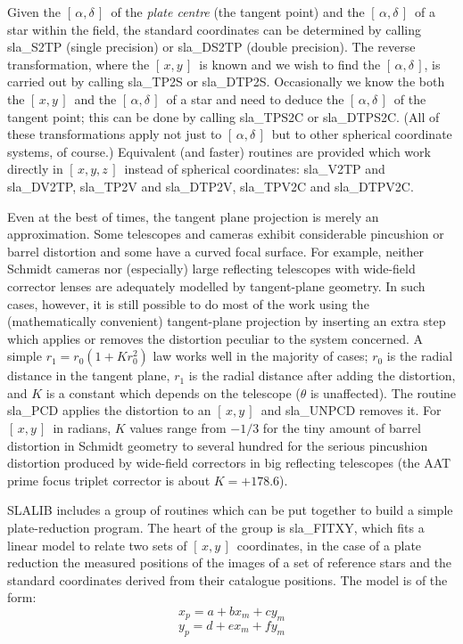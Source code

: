 \documentclass[11pt,twoside,nolof]{starlink}
\providecommand{\radec}     {$[\,\alpha,\delta\,]$}
\providecommand{\xy}        {$[\,x,y\,]$}
\providecommand{\xyz}       {$[\,x,y,z\,]$}
\begin{document}
Given the \radec\ of the \textit{plate centre}\/ (the tangent point)
and the \radec\ of a star within the field, the standard
coordinates can be determined by calling
sla\_S2TP
(single precision) or
sla\_DS2TP
(double precision).  The reverse transformation, where the
\xy\ is known and we wish to find the \radec, is carried out by calling
sla\_TP2S
or
sla\_DTP2S.
Occasionally we know the both the \xy\ and the \radec\ of a
star and need to deduce the \radec\ of the tangent point;
this can be done by calling
sla\_TPS2C
or
sla\_DTPS2C.
(All of these transformations apply not just to \radec\ but to
other spherical coordinate systems, of course.)
Equivalent (and faster)
routines are provided which work directly in \xyz\ instead of
spherical coordinates:
sla\_V2TP and
sla\_DV2TP,
sla\_TP2V and
sla\_DTP2V,
sla\_TPV2C and
sla\_DTPV2C.

Even at the best of times, the tangent plane projection is merely an
approximation.  Some telescopes and cameras exhibit considerable pincushion
or barrel distortion and some have a curved focal surface.
For example, neither Schmidt cameras nor (especially)
large reflecting telescopes with wide-field corrector lenses
are adequately modelled by tangent-plane geometry.  In such
cases, however, it is still possible to do most of the work
using the (mathematically convenient) tangent-plane
projection by inserting an extra step which applies or
removes the distortion peculiar to the system concerned.
A simple $r_1=r_0(1+Kr_0^2)$ law works well in the
majority of cases; $r_0$ is the radial distance in the
tangent plane, $r_1$ is the radial distance after adding
the distortion, and $K$ is a constant which depends on the
telescope ($\theta$ is unaffected).  The routine
sla\_PCD
applies the distortion to an \xy\ and
sla\_UNPCD
removes it.  For \xy\ in radians, $K$ values range from $-1/3$ for the
tiny amount of barrel distortion in Schmidt geometry to several
hundred for the serious pincushion distortion
produced by wide-field correctors in big reflecting telescopes
(the AAT prime focus triplet corrector is about $K=+178.6$).

SLALIB includes a group of routines which can be put together
to build a simple plate-reduction program.  The heart of the group is
sla\_FITXY,
which fits a linear model to relate two sets of \xy\ coordinates,
in the case of a plate reduction the measured positions of the
images of a set of
reference stars and the standard
coordinates derived from their catalogue positions.  The
model is of the form:
\[x_{p} = a + bx_{m} + cy_{m}\]
\[y_{p} = d + ex_{m} + fy_{m}\]
\end{document}
